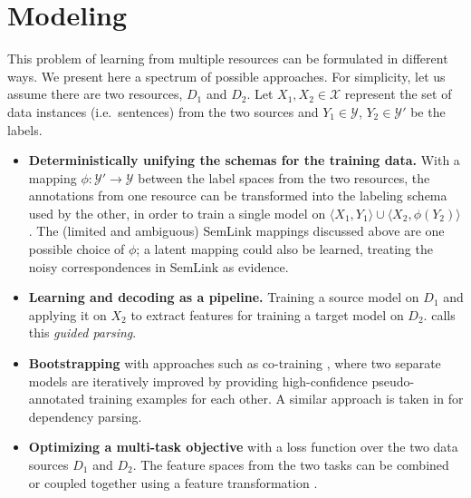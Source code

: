 \documentclass[11pt]{article}
\begin{document}
\section{Modeling}\label{sec:modeling}
This problem of learning from multiple resources can be formulated in different ways. We present here a spectrum of possible approaches. 
For simplicity, let us assume there are two resources, $D_1$ and $D_2$. Let $X_1, X_2 \in \mathcal{X}$ represent the set of data instances (i.e.~sentences) from the two sources and $Y_1 \in \mathcal{Y}$, $Y_2 \in \mathcal{Y}'$ be the labels.
\begin{itemize}
\item \textbf{Deterministically unifying the schemas for the training data.} With a mapping $\phi : \mathcal{Y}' \rightarrow \mathcal{Y}$ between the label spaces from the two resources, the annotations from one resource can be transformed into the labeling schema used by the other, in order to train a single model 
on $\langle X_1, Y_1\rangle \cup \langle X_2, \phi(Y_2)\rangle$. The (limited and ambiguous) SemLink mappings discussed above are one possible choice of $\phi$; 
a latent mapping could also be learned, treating the noisy correspondences in SemLink as evidence.
\item \textbf{Learning and decoding as a pipeline.} Training a source model on $D_1$ and applying it on $X_2$ to extract features for training a target model on $D_2$. 
 calls this \emph{guided parsing}. 
\item \textbf{Bootstrapping} with approaches such as co-training \citep{blum-98,clark03}, where two separate models are iteratively improved by 
providing high-confidence pseudo-annotated training examples for each other. A similar approach is taken in \citet{zhou:2013} for dependency parsing.
\item \textbf{Optimizing a multi-task objective} with a loss function over the two data sources $D_1$ and $D_2$. 
The feature spaces from the two tasks can be combined \citep{daume-07,johansson-13} or coupled together using a feature transformation \citep{mtfl,scl}.
\end{itemize}
\end{document}
